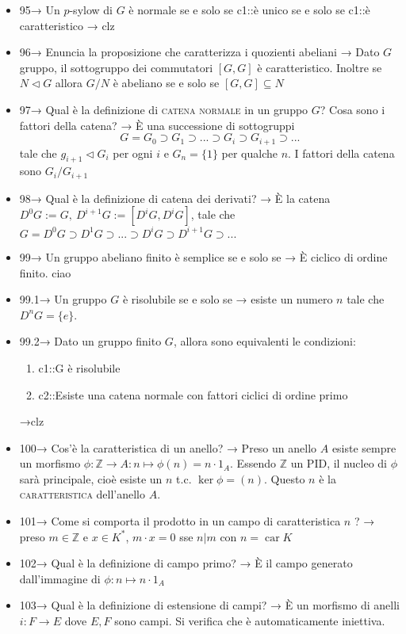 \documentclass[A4,12pt]{article}
\newcommand{\Z}{\mathbb{Z}}
\renewcommand{\subset}{\subseteq}
\newcommand{\psy}{$ p $-sylow }
\begin{document}
\begin{itemize}[noitemsep]
		\item 95→ Un \psy di $ G $ è normale se e solo se {{c1::è unico }} se e solo se {{c1::è caratteristico}} → clz
		\item 96→ Enuncia la proposizione che caratterizza i quozienti abeliani → Dato $ G $ gruppo, il sottogruppo dei commutatori $ [G,G] $ è caratteristico. Inoltre se $ N\lhd G $ allora $ G/N $ è abeliano se e solo se $ [G,G]\subset N $
		\item 97→ Qual è la definizione di \textsc{catena normale} in un gruppo $ G $? Cosa sono i fattori della catena? → È una successione di sottogruppi \[G=G_0 \supset G_1\supset ...\supset G_i\supset G_{i+1}\supset ...\] tale che $ g_{i+1}\lhd G_i$ per ogni $ i $ e $ G_n=\{1\} $ per qualche $ n $. I fattori della catena sono $ G_i/G_{i+1} $
		\item 98→ Qual è la definizione di catena dei derivati? → È la catena $ D^0G:=G,\ D^{i+1}G:=[D^iG,D^iG] $, tale che $ G=D^0G\supset D^1 G\supset...\supset D^i G\supset D^{i+1}G\supset ... $
		\item 99→ Un gruppo abeliano finito è semplice se e solo se → È ciclico di ordine finito. ciao
		\item 99.1→ Un gruppo $ G $ è risolubile se e solo se → esiste un numero $ n $ tale che $ D^nG = \{e\}$.
		\item 99.2→ Dato un gruppo finito $ G $, allora sono equivalenti le condizioni: \begin{enumerate}
			\item {{c1::G è risolubile}}
			\item {{c2::Esiste una catena normale con fattori ciclici di ordine primo}}
		\end{enumerate}→clz
		\item 100→ Cos'è la caratteristica di un anello? → Preso un anello $ A $ esiste sempre un morfismo $ \phi:\Z \to A: n\mapsto \phi(n) = n\cdot 1_A $. Essendo $ \Z $ un PID, il nucleo di $ \phi $ sarà principale, cioè esiste un $ n $ t.c. $ \ker\phi= (n) $. Questo $ n $ è la \textsc{caratteristica} dell'anello $ A $.
		\item 101→ Come si comporta il prodotto in un campo di caratteristica $ n $ ? → preso $ m\in \Z $ e $ x\in K^* $, $ m\cdot x  = 0$ sse $ n|m $ con $ n = \operatorname{car}K$ 
		\item 102→ Qual è la definizione di campo primo? → È il campo generato dall'immagine di $ \phi:n\mapsto n\cdot 1_A $
		\item 103→ Qual è la definizione di estensione di campi? → È un morfismo di anelli $ i:F\to E $ dove $ E,F $ sono campi. Si verifica che è automaticamente iniettiva.

\end{itemize}
\end{document}
